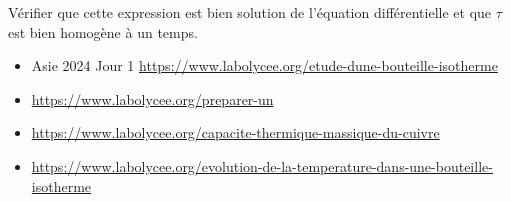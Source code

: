 Vérifier que cette expression est bien solution de l'équation différentielle et que $\tau$ est bien homogène à un temps.

\begin{travail}
\begin{itemize}
	\item Asie 2024 Jour 1  \url{https://www.labolycee.org/etude-dune-bouteille-isotherme}
	\item \url{https://www.labolycee.org/preparer-un}
\item \url{https://www.labolycee.org/capacite-thermique-massique-du-cuivre}
\item \url{https://www.labolycee.org/evolution-de-la-temperature-dans-une-bouteille-isotherme}

\end{itemize}
\end{travail}
